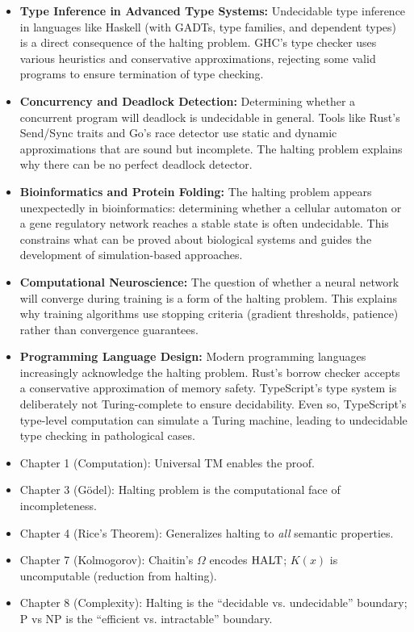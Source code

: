 \begin{itemize}
\item \textbf{Type Inference in Advanced Type Systems:} Undecidable type inference in languages like Haskell (with GADTs, type families, and dependent types) is a direct consequence of the halting problem. GHC's type checker uses various heuristics and conservative approximations, rejecting some valid programs to ensure termination of type checking.

\item \textbf{Concurrency and Deadlock Detection:} Determining whether a concurrent program will deadlock is undecidable in general. Tools like Rust's Send/Sync traits and Go's race detector use static and dynamic approximations that are sound but incomplete. The halting problem explains why there can be no perfect deadlock detector.

\item \textbf{Bioinformatics and Protein Folding:} The halting problem appears unexpectedly in bioinformatics: determining whether a cellular automaton or a gene regulatory network reaches a stable state is often undecidable. This constrains what can be proved about biological systems and guides the development of simulation-based approaches.

\item \textbf{Computational Neuroscience:} The question of whether a neural network will converge during training is a form of the halting problem. This explains why training algorithms use stopping criteria (gradient thresholds, patience) rather than convergence guarantees.

\item \textbf{Programming Language Design:} Modern programming languages increasingly acknowledge the halting problem. Rust's borrow checker accepts a conservative approximation of memory safety. TypeScript's type system is deliberately not Turing-complete to ensure decidability. Even so, TypeScript's type-level computation can simulate a Turing machine, leading to undecidable type checking in pathological cases.
\end{itemize}

\begin{itemize}
\item Chapter 1 (Computation): Universal TM enables the proof.
\item Chapter 3 (G\"odel): Halting problem is the computational face of incompleteness.
\item Chapter 4 (Rice's Theorem): Generalizes halting to \emph{all} semantic properties.
\item Chapter 7 (Kolmogorov): Chaitin's $\Omega$ encodes $\text{HALT}$; $K(x)$ is uncomputable (reduction from halting).
\item Chapter 8 (Complexity): Halting is the ``decidable vs. undecidable'' boundary; P vs NP is the ``efficient vs. intractable'' boundary.
\end{itemize}

